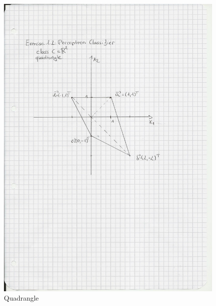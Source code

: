 \documentclass{scrartcl}
\begin{document}
\begin{figure}[ht]
\begin{center}
\includegraphics[scale=0.3]{Attachment3.jpg}
\end{center}
\caption{Quadrangle}
\label{Img:Exercise 1.2}
\end{figure}
\end{document}
